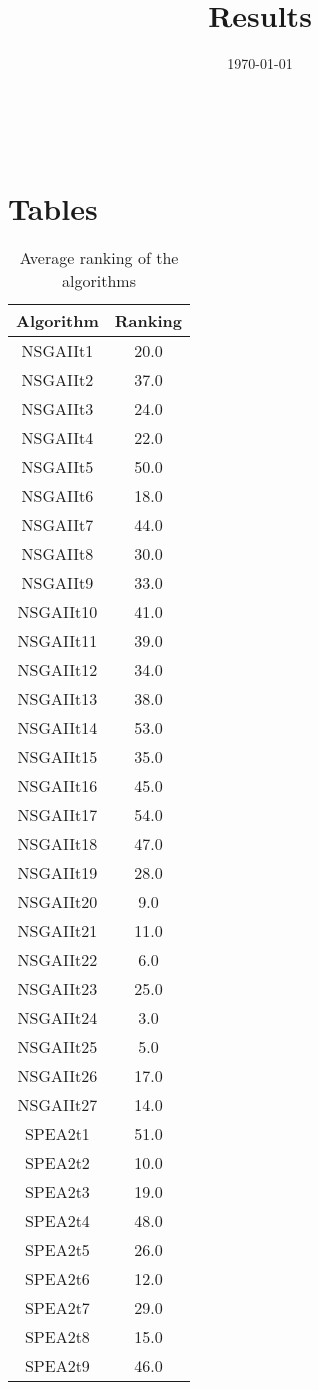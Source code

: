\documentclass{article}
\title{Results}
\author{}
\date{\today}
\begin{document}
\oddsidemargin 0in \topmargin 0in\maketitle
\
\section{Tables}
\begin{table}[!htp]
\centering
\caption{Average ranking of the algorithms}
\begin{tabular}{c|c}
Algorithm&Ranking\\
\hline
NSGAIIt1&20.0\\
NSGAIIt2&37.0\\
NSGAIIt3&24.0\\
NSGAIIt4&22.0\\
NSGAIIt5&50.0\\
NSGAIIt6&18.0\\
NSGAIIt7&44.0\\
NSGAIIt8&30.0\\
NSGAIIt9&33.0\\
NSGAIIt10&41.0\\
NSGAIIt11&39.0\\
NSGAIIt12&34.0\\
NSGAIIt13&38.0\\
NSGAIIt14&53.0\\
NSGAIIt15&35.0\\
NSGAIIt16&45.0\\
NSGAIIt17&54.0\\
NSGAIIt18&47.0\\
NSGAIIt19&28.0\\
NSGAIIt20&9.0\\
NSGAIIt21&11.0\\
NSGAIIt22&6.0\\
NSGAIIt23&25.0\\
NSGAIIt24&3.0\\
NSGAIIt25&5.0\\
NSGAIIt26&17.0\\
NSGAIIt27&14.0\\
SPEA2t1&51.0\\
SPEA2t2&10.0\\
SPEA2t3&19.0\\
SPEA2t4&48.0\\
SPEA2t5&26.0\\
SPEA2t6&12.0\\
SPEA2t7&29.0\\
SPEA2t8&15.0\\
SPEA2t9&46.0\\

\end{tabular}
\end{table}
\end{document}
